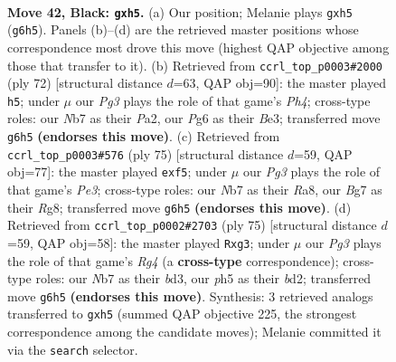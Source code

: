 \documentclass[11pt]{article}
\begin{document}
\clearpage

\begin{figure}[p]\centering
\begin{subfigure}{0.46\textwidth}\centering
\resizebox{\linewidth}{!}{%
\newchessgame
\chessboard[
  setfen={1rr5/1n3kbp/p2p2p1/P3p1PP/1pP1P3/1P3PBR/2K3B1/R7 b - - 0 42},
  showmover=false,
  pgfstyle=straightmove, color=movearrow, markmove={g6-h5}
]}
\caption{}
\end{subfigure}\hfill
\begin{subfigure}{0.46\textwidth}\centering
\resizebox{\linewidth}{!}{%
\newchessgame
\chessboard[
  setfen={3r4/5pk1/pprppb1p/6p1/2P1P1PP/1P2B3/P2R1PK1/3R4 w - - 5 37},
  showmover=false,
  pgfstyle=straightmove, color=movearrow, markmove={h4-h5}
]}
\caption{}
\end{subfigure}
\\[4pt]
\begin{subfigure}{0.46\textwidth}\centering
\resizebox{\linewidth}{!}{%
\newchessgame
\chessboard[
  setfen={r5r1/1pb2k2/2p1p2p/2B2Pp1/p2P1P2/3RPK1P/PP4R1/8 b - - 0 38},
  showmover=false,
  pgfstyle=straightmove, color=movearrow, markmove={e6-f5}
]}
\caption{}
\end{subfigure}\hfill
\begin{subfigure}{0.46\textwidth}\centering
\resizebox{\linewidth}{!}{%
\newchessgame
\chessboard[
  setfen={6rk/2p4p/3p3P/P1pPp1r1/2P2p2/R2B1PPb/3B1R2/7K b - - 0 38},
  showmover=false,
  pgfstyle=straightmove, color=movearrow, markmove={g5-g3}
]}
\caption{}
\end{subfigure}
\caption{\textbf{Move 42, Black: \texttt{gxh5}.} (a) Our position; Melanie plays \texttt{gxh5} (\texttt{g6h5}). Panels (b)--(d) are the retrieved master positions whose correspondence most drove this move (highest QAP objective among those that transfer to it). (b) Retrieved from \texttt{ccrl\_top\_p0003\#2000} (ply 72) [structural distance $d$=63, QAP obj=90]: the master played \texttt{h5}; under $\mu$ our \emph{Pg3} plays the role of that game's \emph{Ph4}; cross-type roles: our \emph{N}b7 as their \emph{P}a2, our \emph{P}g6 as their \emph{B}e3; transferred move \texttt{g6h5} \textbf{(endorses this move)}. (c) Retrieved from \texttt{ccrl\_top\_p0003\#576} (ply 75) [structural distance $d$=59, QAP obj=77]: the master played \texttt{exf5}; under $\mu$ our \emph{Pg3} plays the role of that game's \emph{Pe3}; cross-type roles: our \emph{N}b7 as their \emph{R}a8, our \emph{B}g7 as their \emph{R}g8; transferred move \texttt{g6h5} \textbf{(endorses this move)}. (d) Retrieved from \texttt{ccrl\_top\_p0002\#2703} (ply 75) [structural distance $d$=59, QAP obj=58]: the master played \texttt{Rxg3}; under $\mu$ our \emph{Pg3} plays the role of that game's \emph{Rg4} (a \textbf{cross-type} correspondence); cross-type roles: our \emph{N}b7 as their \emph{b}d3, our \emph{p}h5 as their \emph{b}d2; transferred move \texttt{g6h5} \textbf{(endorses this move)}. Synthesis: 3 retrieved analogs transferred to \texttt{gxh5} (summed QAP objective 225, the strongest correspondence among the candidate moves); Melanie committed it via the \texttt{search} selector.}
\label{fig:thought-m83}
\end{figure}
\end{document}
